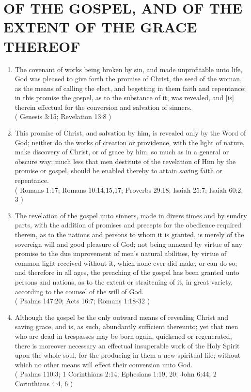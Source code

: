 \documentclass[12pt,a4paper]{book}
\begin{document}
\chapter{OF THE GOSPEL, AND OF THE EXTENT OF THE GRACE THEREOF}
\label{ch-gos-ext}
\begin{enumerate}
\item The covenant of works being broken by sin, and made unprofitable unto life, God was pleased to give forth the promise of Christ, the seed of the woman, as the means of calling the elect, and begetting in them faith and repentance; in this promise the gospel, as to the substance of it, was revealed, and [is] therein effectual for the conversion and salvation of sinners.\\
( Genesis 3:15; Revelation 13:8 )
\item This promise of Christ, and salvation by him, is revealed only by the Word of God; neither do the works of creation or providence, with the light of nature, make discovery of Christ, or of grace by him, so much as in a general or obscure way; much less that men destitute of the revelation of Him by the promise or gospel, should be enabled thereby to attain saving faith or repentance.\\
( Romans 1:17; Romans 10:14,15,17; Proverbs 29:18; Isaiah 25:7; Isaiah 60:2, 3 )
\item The revelation of the gospel unto sinners, made in divers times and by sundry parts, with the addition of promises and precepts for the obedience required therein, as to the nations and persons to whom it is granted, is merely of the sovereign will and good pleasure of God; not being annexed by virtue of any promise to the due improvement of men's natural abilities, by virtue of common light received without it, which none ever did make, or can do so; and therefore in all ages, the preaching of the gospel has been granted unto persons and nations, as to the extent or straitening of it, in great variety, according to the counsel of the will of God.\\
( Psalms 147:20; Acts 16:7; Romans 1:18-32 )
\item Although the gospel be the only outward means of revealing Christ and saving grace, and is, as such, abundantly sufficient thereunto; yet that men who are dead in trespasses may be born again, quickened or regenerated, there is moreover necessary an effectual insuperable work of the Holy Spirit upon the whole soul, for the producing in them a new spiritual life; without which no other means will effect their conversion unto God.\\
( Psalms 110:3; 1 Corinthians 2:14; Ephesians 1:19, 20; John 6:44; 2 Corinthians 4:4, 6 )
\end{enumerate}
\end{document}

